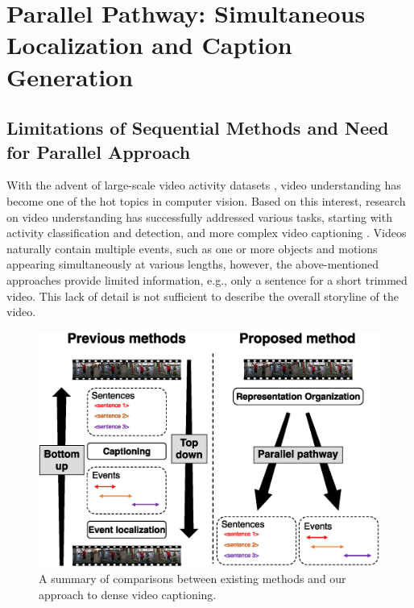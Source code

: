 
\chapter{Parallel Pathway: Simultaneous Localization and Caption Generation}
\label{chap:parallel_pathway}

\section{Limitations of Sequential Methods and Need for Parallel Approach}

With the advent of large-scale video activity datasets \cite{karpathy2014large,caba2015activitynet,kay2017kinetics}, video understanding has become one of the hot topics in computer vision. 
Based on this interest, research on video understanding has successfully addressed various tasks, starting with activity classification and detection, and more complex video captioning \cite{venugopalan2015sequence,venugopalan2015translating,yao2015describing,pan2016hierarchical,pan2016jointly,baraldi2017hierarchical,gan2017semantic,pan2017video,yu2017end,wang2018reconstruction,liu2018fine,xiao2019video,zhu2020understanding,bhooshan2022multimodal,li2022adaptive}.
Videos naturally contain multiple events, such as one or more objects and motions appearing simultaneously at various lengths, however, the above-mentioned approaches provide limited information, e.g., only a sentence for a short trimmed video.
This lack of detail is not sufficient to describe the overall storyline of the video.

\begin{figure}[t]
  \centering
   \includegraphics[width=\linewidth]{figures/ppvc_fig1}
   \caption{A summary of comparisons between existing methods and our approach to dense video captioning.}
   \label{fig:intro_approaches}
\end{figure}

